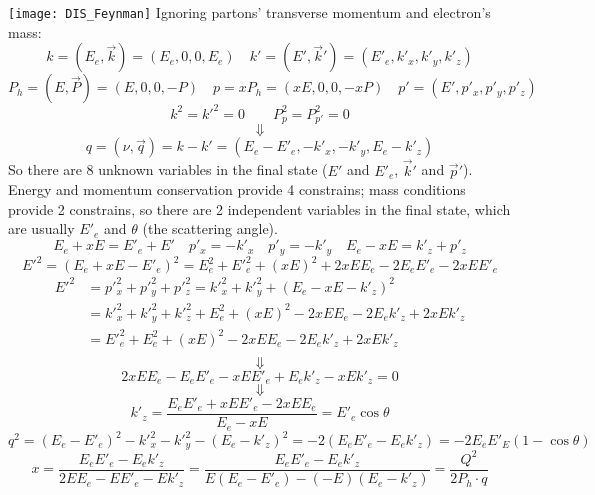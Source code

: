 \texttt{[image: DIS\_Feynman]}
Ignoring partons' transverse momentum and electron's mass:
$$ k = (E_e, \vec{k}) = (E_e, 0, 0, E_e) \quad k' = (E', \vec{k}') = (E'_e, k'_x, k'_y, k'_z) $$
$$ P_h = (E, \vec{P}) = (E, 0, 0, -P)  \quad p = xP_h = (xE, 0, 0, -xP) \quad p' = (E', p'_x, p'_y, p'_z) $$
$$ k^2 = k'^2 = 0 \qquad P_p^2 = P_{p'}^2 = 0 $$
$$ \Downarrow $$
$$ q = (\nu, \vec{q}) = k - k' = (E_e - E'_e, -k'_x, -k'_y, E_e - k'_z) $$
So there are 8 unknown variables in the final state ($E'$ and $E'_e$, $\vec{k}'$ and $\vec{p}'$).
Energy and momentum conservation provide 4 constrains; mass conditions provide 
2 constrains, so there are 2 independent variables in the final state, which are
usually $E'_e$ and $\theta$ (the scattering angle).
$$ E_e + xE = E'_e + E'    \quad p'_x = -k'_x	\quad p'_y = -k'_y  \quad E_e -xE = k'_z + p'_z $$
$$ E'^2 = (E_e + xE - E'_e)^2 = E_e^2 + E'^2_e + (xE)^2 + 2xEE_e - 2E_eE'_e - 2xEE'_e $$
\begin{equation*}
    \begin{aligned}
	E'^2 &= p'^2_x + p'^2_y + p'^2_z = k'^2_x + k'^2_y + (E_e -xE - k'_z)^2	    \\
	     &= k'^2_x + k'^2_y + k'^2_z + E_e^2 + (xE)^2 - 2xEE_e - 2E_ek'_z + 2xEk'_z	\\
	     &= E'^2_e + E_e^2 + (xE)^2 - 2xEE_e - 2E_ek'_z + 2xEk'_z	\\
    \end{aligned}
\end{equation*}
$$ \Downarrow $$
$$ 2xEE_e - E_eE'_e - xEE'_e +E_ek'_z - xEk'_z = 0 $$
$$ \Downarrow $$
$$ k'_z = \frac{E_eE'_e + xEE'_e - 2xEE_e}{E_e-xE} = E'_e\cos\theta $$
$$ q^2 = (E_e - E'_e)^2 - k'^2_x - k'^2_y - (E_e - k'_z)^2 = -2(E_eE'_e - E_ek'_z) = -2E_eE'_E (1 - \cos\theta) $$
$$ x = \frac{E_eE'_e - E_ek'_z}{2EE_e - EE'_e - Ek'_z} = \frac{E_eE'_e - E_ek'_z}{E(E_e - E'_e) - (-E)(E_e - k'_z)} = \frac{Q^2}{2P_h\cdot q} $$

